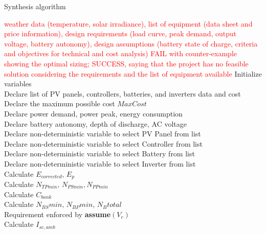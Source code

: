 \documentclass[runningheads]{llncs}
\begin{document}
 \begin{algorithm}
 \caption{Synthesis algorithm}
 \begin{algorithmic}[1]
 \begin{scriptsize}
 \renewcommand{\algorithmicrequire}{\textbf{Input:}}
 \renewcommand{\algorithmicensure}{\textbf{Output:}}
   \REQUIRE \textcolor{red}{weather data (temperature, solar irradiance), list of equipment (data sheet and price information), design requirements (load curve, peak demand, output voltage, battery autonomy), design assumptions (battery state of charge, criteria and objectives for technical and cost analysis)}
 \ENSURE \textcolor{red}{FAIL with counter-example showing the optimal sizing; SUCCESS, saying that the project has no feasible solution considering the requirements and the list of equipment available}
  \STATE Initialize variables \\
  \STATE Declare list of PV panels, controllers, batteries, and inverters data and cost \\
  \STATE Declare the maximum possible cost $MaxCost$  \\
  \STATE Declare power demand, power peak, energy consumption \\
  \STATE Declare battery autonomy, depth of discharge, AC voltage \\
 	\STATE Declare non-deterministic variable to select PV Panel from list \\
 	\STATE Declare non-deterministic variable to select Controller from list \\
 	\STATE Declare non-deterministic variable to select Battery from list \\
 	\STATE Declare non-deterministic variable to select Inverter from list \\ 	
 	\STATE Calculate $E_{corrected}, \, E_{p} $ \\
	\STATE Calculate $N_{TPmin}, \, N_{PSmin}, N_{PPmin} $ \\
 	\STATE Calculate $C_{bank}$ \\
	\STATE Calculate $N_{BS}min, \, N_{BP}min, \, N_{B}total$ \\
	\STATE Requirement enforced by \textbf{assume}$(V_{c})$ \\
 	\STATE Calculate $I_{sc,amb}$ \\

\end{scriptsize}
\end{algorithmic}
\end{algorithm}
\end{document}
